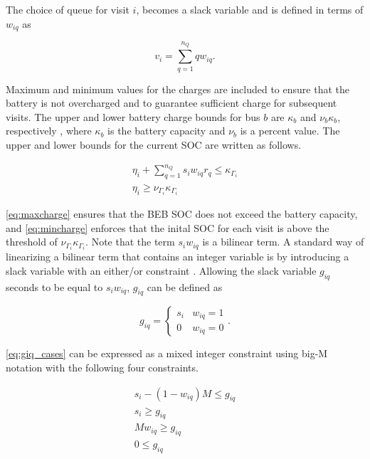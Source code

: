 \documentclass[ee,thesis]{usuthesis}
\begin{document}
The choice of queue for visit \(i\), becomes a slack variable and is defined in terms of \(w_{iq}\) as

\begin{equation}
    v_i = \sum_{q=1}^{n_Q} qw_{iq}.
\end{equation}

Maximum and minimum values for the charges are included to ensure that the battery is not overcharged and to guarantee
sufficient charge for subsequent visits. The upper and lower battery charge bounds for bus \(b\) are \(\kappa_b\) and \(\nu_b \kappa_b\),
respectively , where \(\kappa_b\) is the battery capacity and \(\nu_b\) is a percent value. The upper and lower bounds for the
current SOC are written as follows.

\begin{subequations}
    \label{subeq:pre_min_max}
\begin{align}
    \eta_i + \sum_{q=1}^{n_Q} s_i w_{iq} r_q \leq \kappa_{\Gamma_i} \label{eq:maxcharge}\\
    \eta_i \geq \nu_{\Gamma_i} \kappa_{\Gamma_i} \label{eq:mincharge}
\end{align}
\end{subequations}

\autoref{eq:maxcharge} ensures that the BEB SOC does not exceed the battery capacity, and \autoref{eq:mincharge}
enforces that the inital SOC for each visit is above the threshold of \(\nu_{\Gamma_i}\kappa_{\Gamma_i}\). Note that the term \(s_i w_{iq}\)
is a bilinear term. A standard way of linearizing a bilinear term that contains an integer variable is by introducing a
slack variable with an either/or constraint \cite{chen-2010-applied,rodriguez-2013-compar-asses}. Allowing the slack
variable \(g_{iq}\) seconds to be equal to \(s_i w_{iq}\), \(g_{iq}\) can be defined as

\begin{equation}
    \label{eq:giq_cases}
    g_{iq} =
    \begin{cases}
        s_i & w_{iq} = 1 \\
        0 & w_{iq} = 0
    \end{cases}.
\end{equation}

\autoref{eq:giq_cases} can be expressed as a mixed integer constraint using big-M notation with the following four
constraints.

\begin{subequations}
    \label{eq:slack_gain}
\begin{align}
    s_i - (1 - w_{iq})M \leq g_{iq}  \label{subeq:repgpgret} \\
    s_i \geq g_{iq}                 \label{subeq:repgples} \\
    Mw_{iq} \geq g_{iq}              \label{subeq:repgwgret} \\
    0 \leq g_{iq}                   \label{subeq:repgwles}
\end{align}
\end{subequations}
\end{document}
